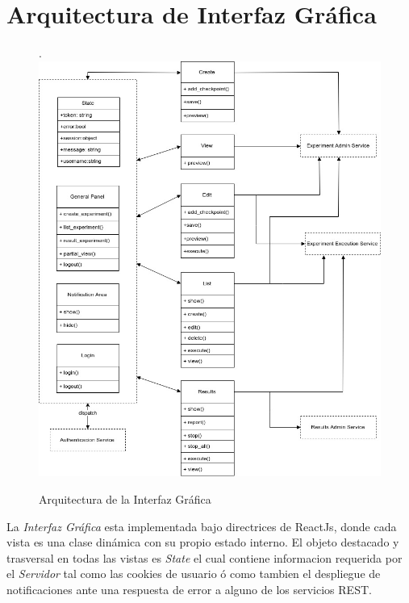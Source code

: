 \section{Arquitectura de Interfaz Gr\'afica}
\begin{figure}[!htb].
    \includegraphics[scale=0.42]{../figures/d21.jpg}
    \caption{Arquitectura de la Interfaz Gr\'afica}
    \label{fig:d21}
\end{figure}

La \textit{Interfaz Gr\'afica} esta implementada bajo directrices de ReactJs, donde
cada vista es una clase din\'amica con su propio estado interno. El objeto destacado y trasversal
en todas las vistas es \textit{State} el cual contiene informacion requerida por el 
\textit{Servidor} tal como las cookies de usuario \'o como tambien el despliegue de notificaciones ante 
una respuesta de error a alguno de los servicios REST.   


\newpage